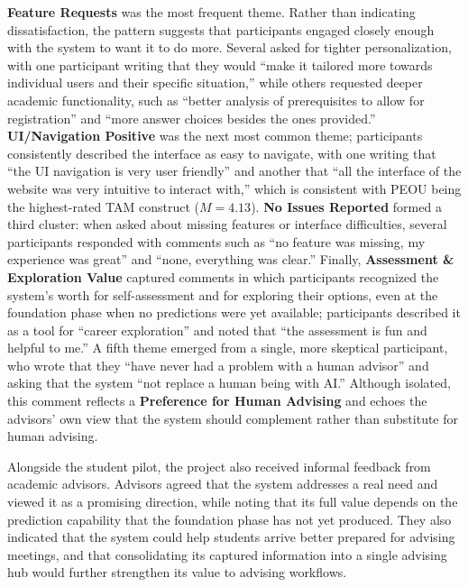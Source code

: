 \documentclass[letterpaper,11pt]{article}
\begin{document}
\textbf{Feature Requests} was the most frequent theme. Rather than indicating dissatisfaction, the pattern suggests that participants engaged closely enough with the system to want it to do more. Several asked for tighter personalization, with one participant writing that they would ``make it tailored more towards individual users and their specific situation,'' while others requested deeper academic functionality, such as ``better analysis of prerequisites to allow for registration'' and ``more answer choices besides the ones provided.'' \textbf{UI/Navigation Positive} was the next most common theme; participants consistently described the interface as easy to navigate, with one writing that ``the UI navigation is very user friendly'' and another that ``all the interface of the website was very intuitive to interact with,'' which is consistent with PEOU being the highest-rated TAM construct ($M=4.13$). \textbf{No Issues Reported} formed a third cluster: when asked about missing features or interface difficulties, several participants responded with comments such as ``no feature was missing, my experience was great'' and ``none, everything was clear.'' Finally, \textbf{Assessment \& Exploration Value} captured comments in which participants recognized the system's worth for self-assessment and for exploring their options, even at the foundation phase when no predictions were yet available; participants described it as a tool for ``career exploration'' and noted that ``the assessment is fun and helpful to me.'' A fifth theme emerged from a single, more skeptical participant, who wrote that they ``have never had a problem with a human advisor'' and asking that the system ``not replace a human being with AI.'' Although isolated, this comment reflects a \textbf{Preference for Human Advising} and echoes the advisors' own view that the system should complement rather than substitute for human advising.

Alongside the student pilot, the project also received informal feedback from academic advisors. Advisors agreed that the system addresses a real need and viewed it as a promising direction, while noting that its full value depends on the prediction capability that the foundation phase has not yet produced. They also indicated that the system could help students arrive better prepared for advising meetings, and that consolidating its captured information into a single advising hub would further strengthen its value to advising workflows.
\end{document}
